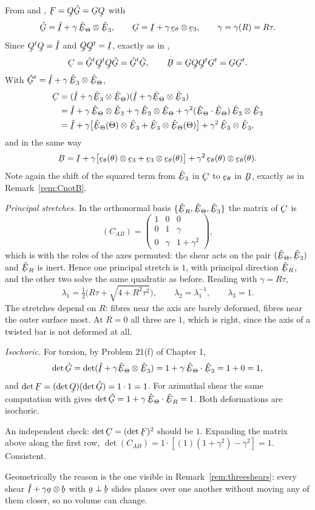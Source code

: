 \begin{solution}
From  and , $\bF=\bQ\hat\bG=\bG\bQ$ with
\[
   \hat\bG=\hI+\gamma\,\hETh\otimes\hbE_{3},\qquad
   \bG=\I+\gamma\,\bet\otimes\be_{3},\qquad \gamma=\gamma(R)=R\tau .
\]
Since $\bQ^{t}\bQ=\hI$ and $\bQ\bQ^{t}=\I$, exactly as in ,
\[
   \bC=\hat\bG^{t}\bQ^{t}\bQ\hat\bG=\hat\bG^{t}\hat\bG,
   \qquad
   \bB=\bG\bQ\bQ^{t}\bG^{t}=\bG\bG^{t}.
\]
With $\hat\bG^{t}=\hI+\gamma\,\hbE_{3}\otimes\hETh$,
\[
\begin{aligned}
   \bC&=(\hI+\gamma\hbE_{3}\otimes\hETh)(\hI+\gamma\hETh\otimes\hbE_{3})\\
   &=\hI+\gamma\,\hETh\otimes\hbE_{3}+\gamma\,\hbE_{3}\otimes\hETh
     +\gamma^{2}(\ip{\hETh}{\hETh})\,\hbE_{3}\otimes\hbE_{3}\\
   &=\hI+\gamma\big[\hETh(\Theta)\otimes\hbE_{3}
      +\hbE_{3}\otimes\hETh(\Theta)\big]
      +\gamma^{2}\,\hbE_{3}\otimes\hbE_{3},
\end{aligned}
\]
and in the same way
\[
   \bB=\I+\gamma\big[\bet(\theta)\otimes\be_{3}
      +\be_{3}\otimes\bet(\theta)\big]
      +\gamma^{2}\,\bet(\theta)\otimes\bet(\theta).
\]
Note again the shift of the squared term from $\hbE_{3}$ in $\bC$ to
$\bet$ in $\bB$, exactly as in Remark~\ref{rem:CnotB}.

\emph{Principal stretches.} In the orthonormal basis
$\{\hER,\hETh,\hbE_{3}\}$ the matrix of $\bC$ is
\[
   (C_{AB})=\begin{pmatrix}1&0&0\\ 0&1&\gamma\\ 0&\gamma&1+\gamma^{2}
   \end{pmatrix},
\]
which is  with the roles of the axes permuted: the shear acts on
the pair $(\hETh,\hbE_{3})$ and $\hER$ is inert. Hence one principal
stretch is $1$, with principal direction $\hER$, and the other two solve
the same quadratic as before. Reading  with $\gamma=R\tau$,
\[
   \boxed{\ \lambda_{1}=\tfrac12\big(R\tau+\sqrt{4+R^{2}\tau^{2}}\big),
   \qquad \lambda_{2}=\lambda_{1}^{-1},\qquad \lambda_{3}=1 .\ }
\]
The stretches depend on $R$: fibres near the axis are barely deformed,
fibres near the outer surface most. At $R=0$ all three are $1$, which is
right, since the axis of a twisted bar is not deformed at all.

\emph{Isochoric.} For torsion, by Problem 21(f) of Chapter 1,
\[
   \det\hat\bG=\det(\hI+\gamma\hETh\otimes\hbE_{3})
   =1+\gamma\,\ip{\hETh}{\hbE_{3}}=1+0=1 ,
\]
and $\det\bF=(\det\bQ)(\det\hat\bG)=1\cdot1=1$. For azimuthal shear the
same computation with  gives
$\det\hat\bG=1+\gamma\,\ip{\hETh}{\hER}=1$. Both deformations are
isochoric.

An independent check: $\det\bC=(\det\bF)^{2}$ should be $1$. Expanding the
matrix above along the first row,
$\det(C_{AB})=1\cdot[(1)(1+\gamma^{2})-\gamma^{2}]=1$. Consistent.

Geometrically the reason is the one visible in
Remark~\ref{rem:threeshears}: every shear $\hI+\gamma\ba\otimes\bb$ with
$\ba\perp\bb$ slides planes over one another without moving any of them
closer, so no volume can change.
\end{solution}

